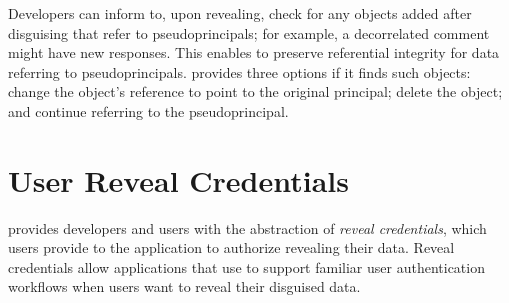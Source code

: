  Developers can inform \sys to, upon revealing, check for any objects
added after disguising that refer to pseudoprincipals; for example, a
decorrelated comment might have new responses. This enables \sys to preserve
referential integrity for data referring to pseudoprincipals. \sys
provides three options if it finds such objects: \one{} change the object's
reference to point to the original principal; \two{} delete the object; and
\three{} continue referring to the pseudoprincipal.

%
%
%
%
%
%
%
%


\section{User Reveal Credentials}
\sys provides developers and users
with the abstraction of \emph{reveal credentials}, which users provide to the
application to authorize revealing their data.
%
Reveal credentials allow applications that use \sys to support familiar user authentication workflows
when users want to reveal their disguised data. 
%

